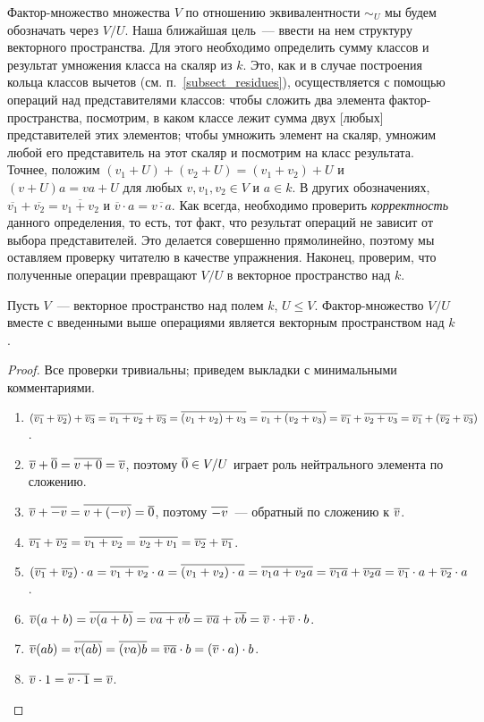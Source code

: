 Фактор-множество множества $V$ по отношению эквивалентности $\sim_U$
мы будем обозначать через $V/U$. Наша ближайшая цель~--- ввести на нем
структуру векторного пространства.
Для этого необходимо определить сумму классов и результат умножения
класса на скаляр из $k$. Это, как и в случае построения кольца
классов вычетов (см. п.~\ref{subsect_residues}), осуществляется с
помощью операций над представителями классов: чтобы сложить два
элемента фактор-пространства, посмотрим, в каком классе лежит сумма
двух [любых] представителей этих элементов; чтобы умножить элемент на
скаляр, умножим любой его представитель на этот скаляр и посмотрим на
класс результата.
Точнее, положим $(v_1+U)+(v_2+U)=(v_1+v_2)+U$ и
$(v+U)a=va+U$ для любых $v,v_1,v_2\in V$ и $a\in k$.
В других обозначениях,
$\overline{v_1}+\overline{v_2} = \overline{v_1+v_2}$ и
$\overline{v}\cdot a = \overline{v\cdot a}$.
Как всегда, необходимо проверить {\em корректность} данного
определения, то есть, тот факт, что результат операций не зависит от
выбора представителей. Это делается совершенно прямолинейно, поэтому
мы оставляем проверку читателю в качестве упражнения.
Наконец, проверим, что полученные операции превращают $V/U$ в
векторное пространство над $k$.
\begin{proposition}\label{prop:quotient_space}
Пусть $V$~--- векторное пространство над полем $k$, $U\leq
V$. Фактор-множество $V/U$ вместе с введенными выше операциями
является векторным пространством над $k$.
\end{proposition}
\begin{proof}
Все проверки тривиальны; приведем выкладки с минимальными
комментариями.
\begin{enumerate}
\item $(\overline{v_1}+\overline{v_2})+\overline{v_3} = \overline{v_1+v_2}+\overline{v_3} =
\overline{(v_1+v_2)+v_3} = \overline{v_1+(v_2+v_3)} = \overline{v_1}+\overline{v_2+v_3} =
\overline{v_1}+(\overline{v_2}+\overline{v_3})$.
\item $\overline{v}+\overline{0}=\overline{v+0}=\overline{v}$, поэтому $\overline{0}\in V/U$ играет
  роль нейтрального элемента по сложению.
\item $\overline{v}+\overline{-v}=\overline{v+(-v)}=\overline{0}$, поэтому $\overline{-v}$~---
  обратный по сложению к $\overline{v}$.
\item $\overline{v_1}+\overline{v_2}=\overline{v_1+v_2}=\overline{v_2+v_1}=\overline{v_2}+\overline{v_1}$.
\item $(\overline{v_1}+\overline{v_2})\cdot a = \overline{v_1+v_2}\cdot a = 
\overline{(v_1+v_2)\cdot a} = \overline{v_1 a+v_2 a} =
\overline{v_1 a} + \overline{v_2 a} = \overline{v_1}\cdot a +
\overline{v_2}\cdot a$.
\item $\overline{v}(a+b) = \overline{v(a+b)} = \overline{va+vb}
  = \overline{va} + \overline{vb} = \overline{v}\cdot  + \overline{v}\cdot b$.
\item $\overline{v}(ab) = \overline{v(ab)} = \overline{(va)b} =
  \overline{va}\cdot b = (\overline{v}\cdot a)\cdot b$.
\item $\overline{v}\cdot 1 = \overline{v\cdot 1} = \overline{v}$.
\end{enumerate}
\end{proof}


